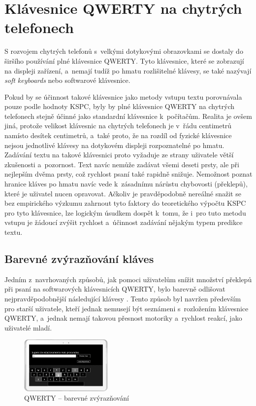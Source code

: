 \documentclass[a4paper,11pt,openany]{book} %
\begin{document}
\section{Klávesnice QWERTY na chytrých telefonech}

S rozvojem chytrých telefonů s~velkými dotykovými obrazovkami se dostaly do širšího používání plné klávesnice QWERTY. Tyto klávesnice, které se zobrazují na displeji zařízení, a~nemají tudíž po hmatu rozlišitelné klávesy, se také nazývají {\it soft keyboards} nebo softwarové klávesnice.

Pokud by se účinnost takové klávesnice jako metody vstupu textu porovnávala pouze podle hodnoty KSPC, byly by plné klávesnice QWERTY na chytrých telefonech stejně účinné jako standardní klávesnice k~počítačům. Realita je ovšem jiná, protože velikost klávesnic na chytrých telefonech je v~řádu centimetrů namísto desítek centimetrů, a~také proto, že na rozdíl od fyzické klávesnice nejsou jednotlivé klávesy na dotykovém displeji rozpoznatelné po hmatu. Zadávání textu na takové klávesnici proto vyžaduje ze strany uživatele větší zkušenosti a~pozornost. Text navíc nemůže zadávat všemi deseti prsty, ale při nejlepším dvěma prsty, což rychlost psaní také rapidně snižuje. Nemožnost poznat hranice kláves po hmatu navíc vede k~zásadnímu nárůstu chybovosti (překlepů), které je uživatel nucen opravovat. Ačkoliv je pravděpodobně nereálné snažit se bez empirického výzkumu zahrnout tyto faktory do teoretického výpočtu KSPC pro tyto klávesnice, lze logickým úsudkem dospět k~tomu, že i~pro tuto metodu vstupu je žádoucí zvýšit rychlost a~účinnost zadávání nějakým typem predikce textu.

\subsection{Barevné zvýrazňování kláves}

Jedním z~navrhovaných způsobů, jak pomoci uživatelům snížit množství překlepů při psaní na softwarových klávesnicích QWERTY, bylo barevně odlišovat nejpravděpodobnější následující klávesy \parencite{danielgoncalves}. %
Tento způsob byl navržen především pro starší uživatele, kteří jednak nemusejí být seznámeni s~rozložením klávesnice QWERTY, a~jednak nemají takovou přesnost motoriky a~rychlost reakcí, jako uživatelé mladí. 

\begin{figure}[ht]
	\centering
	\includegraphics[width=0.4\textwidth]{qwerty_color}
	\caption{QWERTY -- barevné zvýrazňování}
	\label{fig:qwerty-color}
\end{figure}
\end{document}
